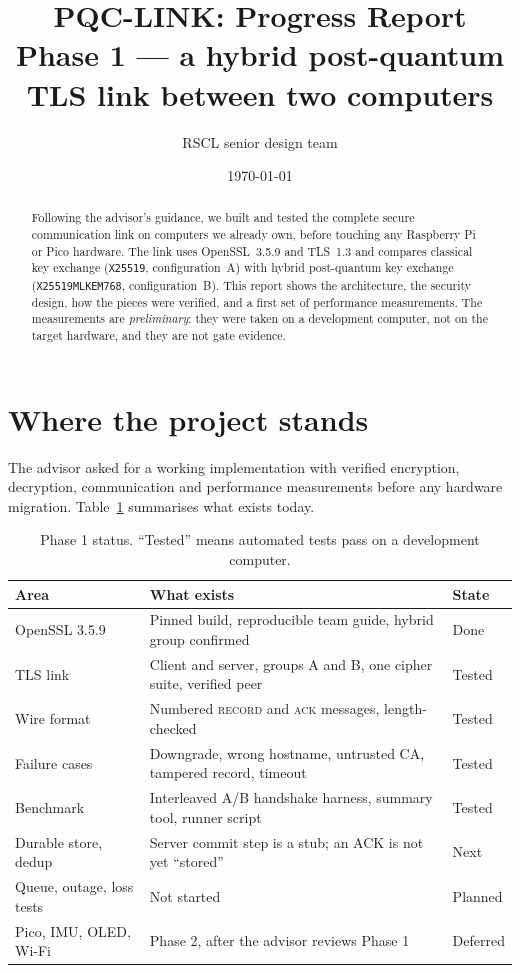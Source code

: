 \documentclass[11pt,a4paper]{article}
\title{\textbf{PQC-LINK: Progress Report}\\[2pt]
       \large Phase 1 --- a hybrid post-quantum TLS link between two computers}
\author{RSCL senior design team}
\date{\today}
\begin{document}
\maketitle

\begin{abstract}
\noindent Following the advisor's guidance, we built and tested the complete secure
communication link on computers we already own, before touching any Raspberry Pi or Pico
hardware. The link uses OpenSSL~3.5.9 and TLS~1.3 and compares classical key exchange
(\texttt{X25519}, configuration~A) with hybrid post-quantum key exchange
(\texttt{X25519MLKEM768}, configuration~B). This report shows the architecture, the security
design, how the pieces were verified, and a first set of performance measurements. The
measurements are \emph{preliminary}: they were taken on a development computer, not on the
target hardware, and they are not gate evidence.
\end{abstract}

\section{Where the project stands}

The advisor asked for a working implementation with verified encryption, decryption,
communication and performance measurements before any hardware migration. Table~\ref{tab:status}
summarises what exists today.

\begin{table}[h]
\centering
\caption{Phase 1 status. ``Tested'' means automated tests pass on a development computer.}
\label{tab:status}
\small
\begin{tabularx}{\linewidth}{@{}lXl@{}}
\toprule
Area & What exists & State \\
\midrule
OpenSSL 3.5.9 & Pinned build, reproducible team guide, hybrid group confirmed & Done \\
TLS link & Client and server, groups A and B, one cipher suite, verified peer & Tested \\
Wire format & Numbered \textsc{record} and \textsc{ack} messages, length-checked & Tested \\
Failure cases & Downgrade, wrong hostname, untrusted CA, tampered record, timeout & Tested \\
Benchmark & Interleaved A/B handshake harness, summary tool, runner script & Tested \\
Durable store, dedup & Server commit step is a stub; an ACK is not yet ``stored'' & Next \\
Queue, outage, loss tests & Not started & Planned \\
Pico, IMU, OLED, Wi-Fi & Phase 2, after the advisor reviews Phase 1 & Deferred \\
\bottomrule
\end{tabularx}
\end{table}
\end{document}

